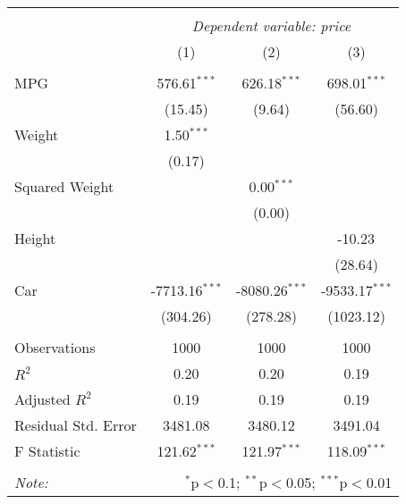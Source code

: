 \begin{table}[!htbp] \centering
\begin{tabular}{@{\extracolsep{5pt}}lccc}
\\[-1.8ex]\hline
\hline \\[-1.8ex]
& \multicolumn{3}{c}{\textit{Dependent variable: price}} \
\cr \cline{2-4}
\\[-1.8ex] & (1) & (2) & (3) \\
\hline \\[-1.8ex]
 MPG & 576.61$^{***}$ & 626.18$^{***}$ & 698.01$^{***}$ \\
& (15.45) & (9.64) & (56.60) \\
 Weight & 1.50$^{***}$ & & \\
& (0.17) & & \\
 Squared Weight & & 0.00$^{***}$ & \\
& & (0.00) & \\
 Height & & & -10.23$^{}$ \\
& & & (28.64) \\
 Car & -7713.16$^{***}$ & -8080.26$^{***}$ & -9533.17$^{***}$ \\
& (304.26) & (278.28) & (1023.12) \\
\hline \\[-1.8ex]
 Observations & 1000 & 1000 & 1000 \\
 $R^2$ & 0.20 & 0.20 & 0.19 \\
 Adjusted $R^2$ & 0.19 & 0.19 & 0.19 \\
 Residual Std. Error & 3481.08 & 3480.12 & 3491.04 \\
 F Statistic & 121.62$^{***}$ & 121.97$^{***}$ & 118.09$^{***}$ \\
\hline
\hline \\[-1.8ex]
\textit{Note:} & \multicolumn{3}{r}{$^{*}$p$<$0.1; $^{**}$p$<$0.05; $^{***}$p$<$0.01} \\
\end{tabular}
\end{table}